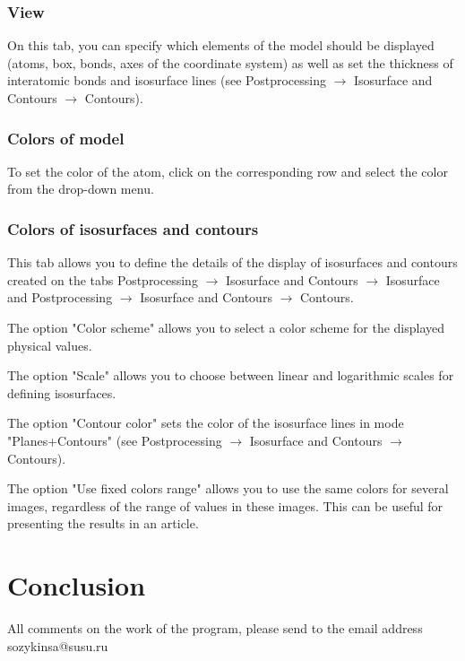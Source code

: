 \documentclass{article}
\begin{document}
\subsubsection{View}

On this tab, you can specify which elements of the model should be displayed (atoms, box, bonds, axes of the coordinate system) as well as set the thickness of interatomic bonds and isosurface lines (see Postprocessing $\to$ Isosurface and Contours $\to$ Contours).

\subsubsection{Colors of model}

To set the color of the atom, click on the corresponding row and select the color from the drop-down menu.

\subsubsection{Colors of isosurfaces and contours \label{colorsisos} }

This tab allows you to define the details of the display of isosurfaces and contours created on the tabs Postprocessing $\to$ Isosurface and Contours $\to$ Isosurface and Postprocessing $\to$ Isosurface and Contours $\to$ Contours.

The option "Color scheme" allows you to select a color scheme for the displayed physical values.


The option "Scale" allows you to choose between linear and logarithmic scales for defining isosurfaces.


The option "Contour color" sets the color of the isosurface lines in mode "Planes+Contours" (see Postprocessing $\to$ Isosurface and Contours $\to$ Contours).


The option "Use fixed colors range" allows you to use the same colors for several images, regardless of the range of values in these images. This can be useful for presenting the results in an article.


\section{Conclusion}
	All comments on the work of the program, please send to the email address sozykinsa@susu.ru
	

	
\end{document}

